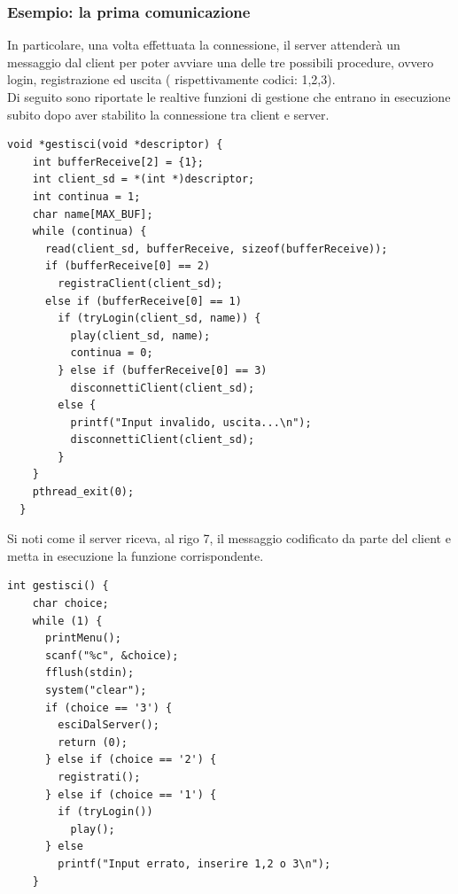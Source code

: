 \documentclass[a4paper]{article}
\begin{document}
 \subsubsection{Esempio: la prima comunicazione}
 In particolare, una volta effettuata la connessione,
il server attenderà un messaggio dal client per poter avviare una delle tre possibili procedure, ovvero login, registrazione ed uscita ( rispettivamente codici: 1,2,3).\\
Di seguito sono riportate le realtive funzioni di gestione che entrano in esecuzione subito dopo aver stabilito la connessione
tra client e server.
\begin{lstlisting}[caption=Prima comunicazione del server, label=alg:serverPreLogin]
  void *gestisci(void *descriptor) {
    int bufferReceive[2] = {1};
    int client_sd = *(int *)descriptor;
    int continua = 1;
    char name[MAX_BUF];
    while (continua) {
      read(client_sd, bufferReceive, sizeof(bufferReceive));
      if (bufferReceive[0] == 2)
        registraClient(client_sd);
      else if (bufferReceive[0] == 1)
        if (tryLogin(client_sd, name)) {
          play(client_sd, name);
          continua = 0;
        } else if (bufferReceive[0] == 3)
          disconnettiClient(client_sd);
        else {
          printf("Input invalido, uscita...\n");
          disconnettiClient(client_sd);
        }
    }
    pthread_exit(0);
  }
\end{lstlisting}
Si noti come il server riceva, al rigo 7, il messaggio codificato da parte del client e metta in esecuzione la funzione corrispondente.
\begin{lstlisting}[caption=Prima comunicazione del client, label=alg:clientPreLogin]
  int gestisci() {
    char choice;
    while (1) {
      printMenu();
      scanf("%c", &choice);
      fflush(stdin);
      system("clear");
      if (choice == '3') {
        esciDalServer();
        return (0);
      } else if (choice == '2') {
        registrati();
      } else if (choice == '1') {
        if (tryLogin())
          play();
      } else
        printf("Input errato, inserire 1,2 o 3\n");
    }
  \end{lstlisting}
\end{document}
